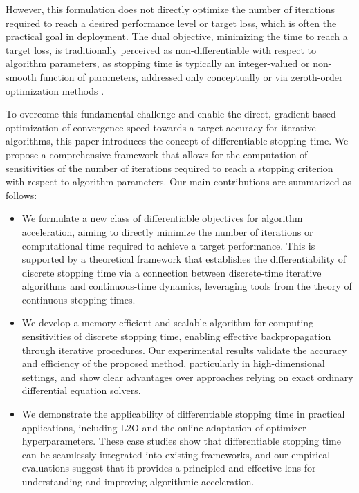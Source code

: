 \documentclass{article}
\begin{document}
However, this formulation does not directly optimize the number of iterations required to reach a desired performance level or target loss, which is often the practical goal in deployment. The dual objective, minimizing the time to reach a target loss, is traditionally perceived as non-differentiable with respect to algorithm parameters, as stopping time is typically an integer-valued or non-smooth function of parameters, addressed only conceptually or via zeroth-order optimization methods \cite{nemirovskij1983problem}.

To overcome this fundamental challenge and enable the direct, gradient-based optimization of convergence speed towards a target accuracy for iterative algorithms, this paper introduces the concept of differentiable stopping time. We propose a comprehensive framework that allows for the computation of sensitivities of the number of iterations required to reach a stopping criterion with respect to algorithm parameters. Our main contributions are summarized as follows:
\begin{itemize}
    \item We formulate a new class of differentiable objectives for algorithm acceleration, aiming to directly minimize the number of iterations or computational time required to achieve a target performance. This is supported by a theoretical framework that establishes the differentiability of discrete stopping time via a connection between discrete-time iterative algorithms and continuous-time dynamics, leveraging tools from the theory of continuous stopping times.
    \item We develop a memory-efficient and scalable algorithm for computing sensitivities of discrete stopping time, enabling effective backpropagation through iterative procedures. Our experimental results validate the accuracy and efficiency of the proposed method, particularly in high-dimensional settings, and show clear advantages over approaches relying on exact ordinary differential equation solvers.
    \item We demonstrate the applicability of differentiable stopping time in practical applications, including L2O and the online adaptation of optimizer hyperparameters. These case studies show that differentiable stopping time can be seamlessly integrated into existing frameworks, and our empirical evaluations suggest that it provides a principled and effective lens for understanding and improving algorithmic acceleration.
\end{itemize}
\end{document}
